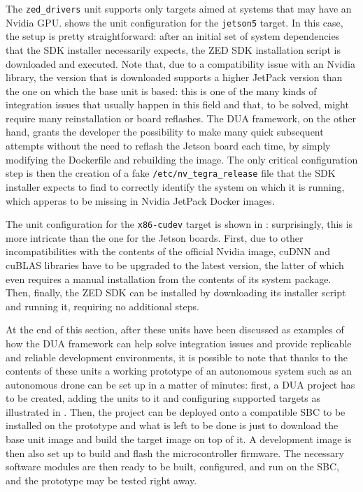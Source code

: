 The \texttt{zed\_drivers} unit supports only targets aimed at systems that may have an Nvidia GPU.  shows the unit configuration for the \texttt{jetson5} target. In this case, the setup is pretty straightforward: after an initial set of system dependencies that the SDK installer necessarily expects, the ZED SDK installation script is downloaded and executed. Note that, due to a compatibility issue with an Nvidia library, the version that is downloaded supports a higher JetPack version than the one on which the base unit is based: this is one of the many kinds of integration issues that usually happen in this field and that, to be solved, might require many reinstallation or board reflashes. The DUA framework, on the other hand, grants the developer the possibility to make many quick subsequent attempts without the need to reflash the Jetson board each time, by simply modifying the Dockerfile and rebuilding the image. The only critical configuration step is then the creation of a fake \texttt{/etc/nv\_tegra\_release} file that the SDK installer expects to find to correctly identify the system on which it is running, which apperas to be missing in Nvidia JetPack Docker images.

The unit configuration for the \texttt{x86-cudev} target is shown in : surprisingly, this is more intricate than the one for the Jetson boards. First, due to other incompatibilities with the contents of the official Nvidia image, cuDNN \cite{nvidia_cuda_nodate} and cuBLAS libraries have to be upgraded to the latest version, the latter of which even requires a manual installation from the contents of its system package. Then, finally, the ZED SDK can be installed by downloading its installer script and running it, requiring no additional steps.

At the end of this section, after these units have been discussed as examples of how the DUA framework can help solve integration issues and provide replicable and reliable development environments, it is possible to note that thanks to the contents of these units a working prototype of an autonomous system such as an autonomous drone can be set up in a matter of minutes: first, a DUA project has to be created, adding the units to it and configuring supported targets as illustrated in . Then, the project can be deployed onto a compatible SBC to be installed on the prototype and what is left to be done is just to download the base unit image and build the target image on top of it. A development image is then also set up to build and flash the microcontroller firmware. The necessary software modules are then ready to be built, configured, and run on the SBC, and the prototype may be tested right away.

